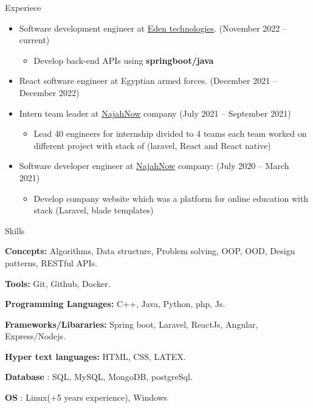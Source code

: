 \documentclass{resume}
\begin{document}
\begin{rSection}{Experiece}
  \begin{itemize}
    \item Software development engineer at \href{https://www.linkedin.com/company/edentech2/mycompany/}{Eden technologies}. \hfill{(November 2022 – current)}
          \begin{itemize}
            \item Develop back-end APIs using \textbf{springboot/java}
          \end{itemize}
    \item React software engineer at Egyptian armed forces. \hfill{(December 2021 – December 2022)}
    \item Intern team leader at \href{https://najahnow.net}{NajahNow} company \hfill{(July 2021 – September 2021)}
          \begin{itemize}
            \item Lead 40 engineers for internship divided to 4 teams each team worked on different project with stack of (laravel, React and React native)
          \end{itemize}

    \item Software developer engineer at \href{https://najahnow.net}{NajahNow} company: \hfill{(July 2020 – March 2021)}
          \begin{itemize}
            \item Develop company website which was a platform for online education with stack (Laravel, blade templates)
          \end{itemize}
  \end{itemize}
\end{rSection}


\begin{rSection}{Skills}
  \item \textbf{Concepts:} Algorithms, Data structure, Problem solving, OOP, OOD, Design patterns, RESTful APIs.
  \item \textbf{Tools:} Git, Github, Docker.
  \item \textbf{Programming Languages:} C++, Java, Python, php, Js.
  \item \textbf{Frameworks/Libararies:} Spring boot, Laravel, ReactJs, Angular, Express/Nodejs.
  \item \textbf{Hyper text languages:} HTML, CSS, LATEX.
  \item \textbf{Database}  : SQL, MySQL, MongoDB, postgreSql.
  \item \textbf{OS} : Linux(+5 years experience), Windows
\end{rSection}
\end{document}
